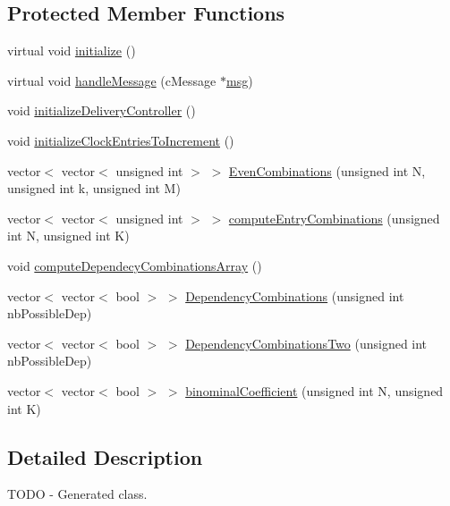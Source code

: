 \subsection*{Protected Member Functions}
\begin{DoxyCompactItemize}
\item 
virtual void \hyperlink{class_simulation_parameters_a1fa495ef59a10cb9a0aff42f3e2625ef}{initialize} ()
\item 
virtual void \hyperlink{class_simulation_parameters_a9966d132ac2b5dc248973185a1a8deb4}{handle\+Message} (c\+Message $\ast$\hyperlink{_controller_8h_afa0f3b802fbc219228f7bb97996fa558}{msg})
\item 
void \hyperlink{class_simulation_parameters_afec1fdd41805feba54ad575a4542aab1}{initialize\+Delivery\+Controller} ()
\item 
void \hyperlink{class_simulation_parameters_aeef091d6ca357795fa7ff6b3661fb2fd}{initialize\+Clock\+Entries\+To\+Increment} ()
\item 
vector$<$ vector$<$ unsigned int $>$ $>$ \hyperlink{class_simulation_parameters_ae7a743b60e8ac2352e4845b104038bde}{Even\+Combinations} (unsigned int N, unsigned int k, unsigned int M)
\item 
vector$<$ vector$<$ unsigned int $>$ $>$ \hyperlink{class_simulation_parameters_a6157da0870526895f7619d614e3b72d0}{compute\+Entry\+Combinations} (unsigned int N, unsigned int K)
\item 
void \hyperlink{class_simulation_parameters_a09bec9dc793646bd71f610eee824dc21}{compute\+Dependecy\+Combinations\+Array} ()
\item 
vector$<$ vector$<$ bool $>$ $>$ \hyperlink{class_simulation_parameters_a9694dd5f7c2028efe03dc273d8fdcbd7}{Dependency\+Combinations} (unsigned int nb\+Possible\+Dep)
\item 
vector$<$ vector$<$ bool $>$ $>$ \hyperlink{class_simulation_parameters_a4e6bb792e1487214e5cf1d64c8841064}{Dependency\+Combinations\+Two} (unsigned int nb\+Possible\+Dep)
\item 
vector$<$ vector$<$ bool $>$ $>$ \hyperlink{class_simulation_parameters_ab0615d3df4a78df81566d219e6e9529f}{binominal\+Coefficient} (unsigned int N, unsigned int K)
\end{DoxyCompactItemize}


\subsection{Detailed Description}
T\+O\+DO -\/ Generated class. 

